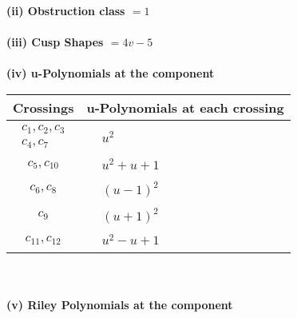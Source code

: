 \documentclass[1p]{elsarticle_modified}
\theoremstyle{definition}
\begin{document}
\flushleft \textbf{(ii) Obstruction class $= 1$}\\~\\
\flushleft \textbf{(iii) Cusp Shapes $= 4 v-5$}\\~\\
\newpage\renewcommand{\arraystretch}{1}
\flushleft \textbf{(iv) u-Polynomials at the component}\newline \\
\begin{tabular}{m{50pt}|m{274pt}}
Crossings & \hspace{64pt}u-Polynomials at each crossing \\
\hline $$\begin{aligned}c_{1},c_{2},c_{3}\\c_{4},c_{7}\end{aligned}$$&$\begin{aligned}
&u^2
\end{aligned}$\\
\hline $$\begin{aligned}c_{5},c_{10}\end{aligned}$$&$\begin{aligned}
&u^2+u+1
\end{aligned}$\\
\hline $$\begin{aligned}c_{6},c_{8}\end{aligned}$$&$\begin{aligned}
&(u-1)^2
\end{aligned}$\\
\hline $$\begin{aligned}c_{9}\end{aligned}$$&$\begin{aligned}
&(u+1)^2
\end{aligned}$\\
\hline $$\begin{aligned}c_{11},c_{12}\end{aligned}$$&$\begin{aligned}
&u^2- u+1
\end{aligned}$\\
\hline
\end{tabular}\\~\\
\newpage\renewcommand{\arraystretch}{1}
\flushleft \textbf{(v) Riley Polynomials at the component}\newline \\
\end{document}

